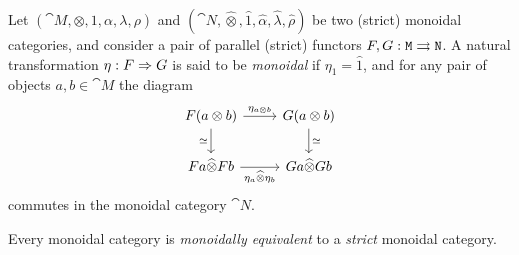 \documentclass[../../deep-dive]{subfiles}
\begin{document}
\begin{definition}
\label{def:monoidal-natural-transformation}
Let \((\cat M, \otimes, 1, \alpha, \lambda, \rho)\) and
\((\cat N, \widehat\otimes, \widehat 1, \widehat \alpha, \widehat \lambda,
\widehat \rho)\) be two (strict) monoidal categories, and consider a pair of
parallel (strict) functors \(F, G: \texttt M \rightrightarrows \texttt N\). A natural
transformation \(\eta: F \Rightarrow G\) is said to be \emph{monoidal} if
\(\eta_1 = \widehat 1\), and for any pair of objects \(a, b \in \cat M\) the
diagram
\[
\begin{tikzcd}
F(a \otimes b) \ar[d, "\dis"']
\ar[r, "\eta_{a \otimes b}"]
&G(a \otimes b) \ar[d, "\dis"] \\
F a \widehat\otimes F b \ar[r, "\eta_a \widehat\otimes \eta_b"']
&G a \widehat\otimes G b
\end{tikzcd}
\]
commutes in the monoidal category \(\cat N\).
\end{definition}

\begin{theorem}
\label{thm:strictification-mon-cat}
Every monoidal category is \emph{monoidally equivalent} to a \emph{strict}
monoidal category.
\end{theorem}
\end{document}
